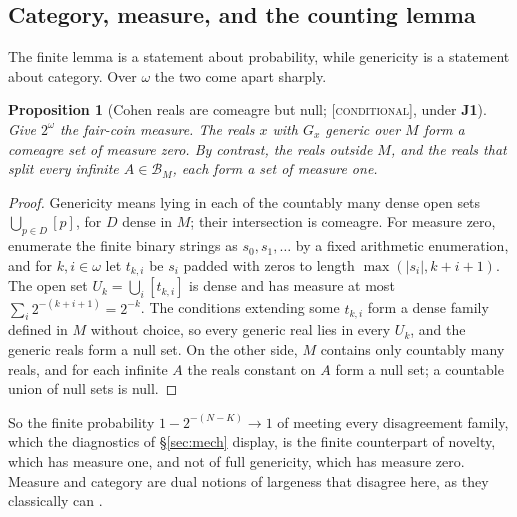 \documentclass[11pt]{article}
\newcommand{\gradetag}[1]{\textnormal{\textsc{[#1]}}}
\newcommand{\condg}{\gradetag{conditional}}
\newtheorem{proposition}[theorem]{Proposition}
\theoremstyle{definition}
\begin{document}
\subsection{Category, measure, and the counting lemma}\label{ssec:category}

The finite lemma is a statement about probability, while genericity is a statement about
category. Over $\omega$ the two come apart sharply.

\begin{proposition}[Cohen reals are comeagre but null; \condg, under \textbf{J1}]\label{prop:category}
Give $2^\omega$ the fair-coin measure. The reals $x$ with $G_x$ generic over $M$ form a comeagre set
of measure zero. By contrast, the reals outside $M$, and the reals that split every infinite
$A\in\mathcal B_M$, each form a set of measure one.
\end{proposition}

\begin{proof}
Genericity means lying in each of the countably many dense open sets $\bigcup_{p\in D}[p]$, for $D$
dense in $M$; their intersection is comeagre. For measure zero, enumerate the finite binary strings
as $s_0,s_1,\dots$ by a fixed arithmetic enumeration, and for $k,i\in\omega$ let $t_{k,i}$ be $s_i$
padded with zeros to length $\max(|s_i|,k+i+1)$. The open set $U_k=\bigcup_i[t_{k,i}]$ is dense and
has measure at most $\sum_i2^{-(k+i+1)}=2^{-k}$. The conditions extending some $t_{k,i}$ form a
dense family defined in $M$ without choice, so every generic real lies in every $U_k$, and the
generic reals form a null set. On the other side, $M$ contains only countably many reals, and for
each infinite $A$ the reals constant on $A$ form a null set; a countable union of null sets is
null.
\end{proof}

So the finite probability $1-2^{-(N-K)}\to1$ of meeting every disagreement family, which the
diagnostics of \S\ref{sec:mech} display, is the finite counterpart of novelty, which has measure
one, and not of full genericity, which has measure zero. Measure and category are dual notions of
largeness that disagree here, as they classically can \citep{Oxtoby1980}.
\end{document}
